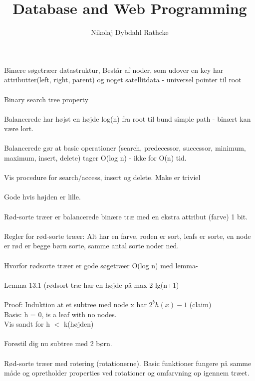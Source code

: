 \documentclass[12pt]{article}
\title{Database and Web Programming}
\author{Nikolaj Dybdahl Rathcke}
\begin{document}
Binære søgetræer datastruktur, Består af noder, som udover en key har\\ attributter(left, right, parent) og noget satellitdata -  universel pointer til root\\
\\
Binary search tree property\\
\\
Balancerede har højst en højde log(n) fra root til bund simple path - binært kan være lort.\\
\\
Balancerede gør at basic operationer (search, predecessor, successor, minimum, maximum, insert, delete) tager O(log n) - ikke for O(n) tid.\\
\\
Vis procedure for search/access, insert og delete. Make er triviel\\
\\
Gode hvis højden er lille.\\
\\
Rød-sorte træer er balancerede binære træ med en ekstra attribut (farve) 1 bit. \\
\\
Regler for rød-sorte træer: Alt har en farve, roden er sort, leafs er sorte, en node er rød er begge børn sorte, samme antal sorte noder ned.\\
\\
Hvorfor rødsorte træer er gode søgetræer O(log n) med lemma-\\
\\
Lemma 13.1 (rødsort træ har en højde på max 2 lg(n+1)\\
\\
Proof: Induktion at et subtree med node x har $2^bh(x)-1$ (claim)
\\
Basis: h = 0, is a leaf with no nodes.\\
Vis sandt for h $<$ k(højden)\\
\\
Forestil dig nu subtree med 2 børn.\\
\\
Rød-sorte træer med rotering (rotationerne). Basic funktioner fungere på samme måde og opretholder properties ved rotationer og omfarvning op igennem træet.
\end{document}
